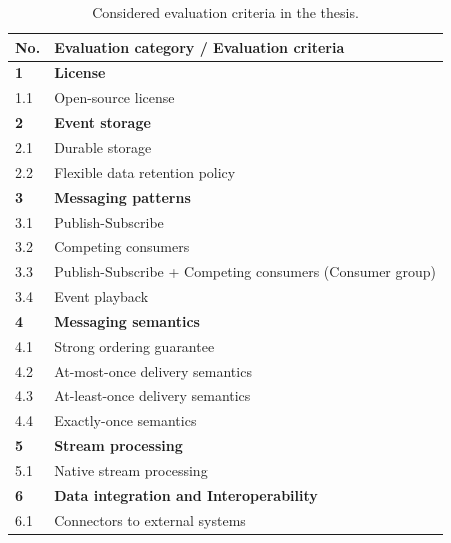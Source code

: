 \begin{table}[h]
	\centering
	\caption{Considered evaluation criteria in the thesis.}
	\label{table:criteria}
	\begin{tabular}{|l|l|}
		\hline
		\textbf{No.} & \textbf{Evaluation category / Evaluation criteria}       \\ \hline
		\textbf{1}   & \textbf{License}                                         \\ \hline
		1.1          & Open-source license                                      \\ \hline
		\textbf{2}   & \textbf{Event storage}                                   \\ \hline
		2.1          & Durable storage                                          \\ \hline
		2.2          & Flexible data retention policy                           \\ \hline
		\textbf{3}   & \textbf{Messaging patterns}                              \\ \hline
		3.1          & Publish-Subscribe                                        \\ \hline
		3.2          & Competing consumers                                      \\ \hline
		3.3          & Publish-Subscribe + Competing consumers (Consumer group) \\ \hline
		3.4          & Event playback                                           \\ \hline
		\textbf{4}   & \textbf{Messaging semantics}                             \\ \hline
		4.1          & Strong ordering guarantee                                \\ \hline
		4.2          & At-most-once delivery semantics                          \\ \hline
		4.3          & At-least-once delivery semantics                         \\ \hline
		4.4          & Exactly-once semantics                                   \\ \hline
		\textbf{5}   & \textbf{Stream processing}                               \\ \hline
		5.1          & Native stream processing                                 \\ \hline
		\textbf{6}   & \textbf{Data integration and Interoperability}           \\ \hline
		6.1          & Connectors to external systems                           \\ \hline

\end{tabular}
\end{table}
